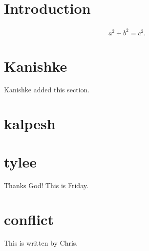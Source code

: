\documentclass{article}
\begin{document}
\section{Introduction}

\begin{align}
    a^2 + b^2 = c^2 .
\end{align}
 
\section{Kanishke}
Kanishke added this section.

\section{kalpesh}



\section{tylee}

Thanks God! This is Friday.

\section{conflict}

This is written by Chris.
\end{document}
